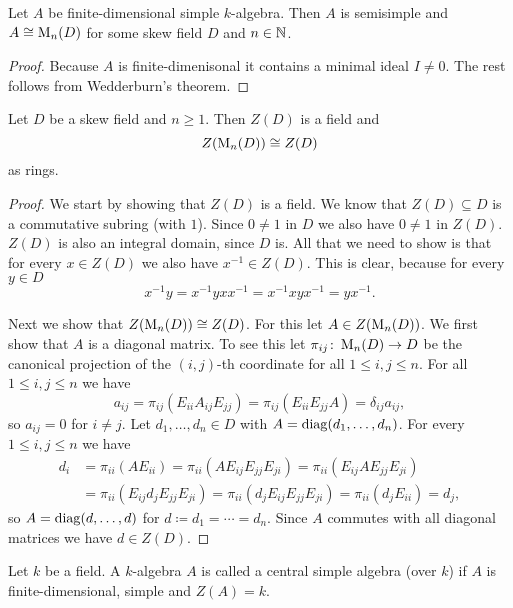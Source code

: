 \begin{cor}
 Let $A$ be finite-dimensional simple $k$-algebra. Then $A$ is semisimple and $A \cong \operatorname{M}_n(D)$ for some skew field $D$ and $n \in \mathbb{N}$.
\end{cor}
\begin{proof}
 Because $A$ is finite-dimenisonal it contains a minimal ideal $I \neq 0$. The rest follows from Wedderburn’s theorem.
\end{proof}


\begin{lem}
 Let $D$ be a skew field and $n \geq 1$. Then $Z(D)$ is a field and
 \[
  Z(\operatorname{M}_n(D)) \cong Z(D)
 \]
 as rings.
\end{lem}
\begin{proof}
 We start by showing that $Z(D)$ is a field. We know that $Z(D) \subseteq D$ is a commutative subring (with $1$). Since $0 \neq 1$ in $D$ we also have $0 \neq 1$ in $Z(D)$. $Z(D)$ is also an integral domain, since $D$ is. All that we need to show is that for every $x \in Z(D)$ we also have $x^{-1} \in Z(D)$. This is clear, because for every $y \in D$
 \[
  x^{-1} y
  = x^{-1} y x x^{-1}
  = x^{-1} x y x^{-1}
  =  y x^{-1}.
 \]
 
 Next we show that $Z(\operatorname{M}_n(D)) \cong Z(D)$. For this let $A \in Z(\operatorname{M}_n(D))$. We first show that $A$ is a diagonal matrix. To see this let $\pi_{ij} \colon \operatorname{M}_n(D) \to D$ be the canonical projection of the $(i,j)$-th coordinate for all $1 \leq i,j \leq n$. For all $1 \leq i,j \leq n$ we have
 \[
  a_{ij} = \pi_{ij}(E_{ii} A_{ij} E_{jj}) = \pi_{ij}(E_{ii} E_{jj} A) = \delta_{ij} a_{ij},
 \]
 so $a_{ij} = 0$ for $i \neq j$. Let $d_1, \dotsc, d_n \in D$ with $A = \operatorname{diag}(d_1, \dotsc, d_n)$. For every $1 \leq i,j \leq n$ we have
 \begin{align*}
  d_i
  &= \pi_{ii}(A E_{ii})
  = \pi_{ii}(A E_{ij} E_{jj} E_{ji})
  = \pi_{ii}(E_{ij} A E_{jj} E_{ji}) \\
  &= \pi_{ii}(E_{ij} d_j E_{jj} E_{ji})
  = \pi_{ii}(d_j E_{ij} E_{jj} E_{ji})
  = \pi_{ii}(d_j E_{ii})
  = d_j,
 \end{align*}
so $A = \operatorname{diag}(d, \dotsc, d)$ for $d \coloneqq d_1 = \dotsb = d_n$. Since $A$ commutes with all diagonal matrices we have $d \in Z(D)$.
\end{proof}


\begin{defi}
 Let $k$ be a field. A $k$-algebra $A$ is called a central simple algebra (over $k$) if $A$ is finite-dimensional, simple and $Z(A) = k$.
\end{defi}


